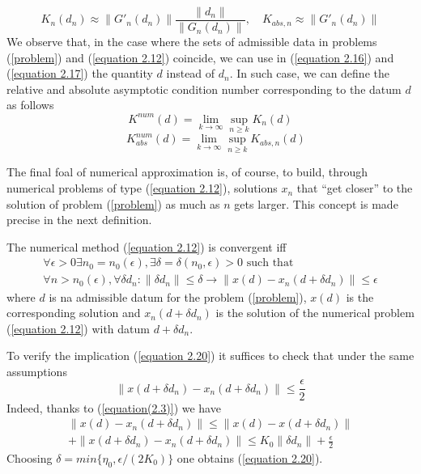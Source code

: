 \begin{equation}
    K_n(d_n) \approx \| G'_n (d_n) \| \frac{ \|d_n \|}{\|G_n(d_n) \|}, \quad K_{abs,n} \approx \|G'_n(d_n) \|
    \label{equation 2.19}
\end{equation}
We observe that, in the case where the sets of admissible data in problems (\ref{problem}) and (\ref{equation 2.12}) coincide, we can use in (\ref{equation 2.16}) and (\ref{equation 2.17}) the quantity $d$ instead of $d_n$. In such case, we can define the relative and absolute asymptotic condition number corresponding to the datum $d$ as follows
\[K^{num}(d) = \lim_{k \rightarrow \infty} \sup_{n \geq k} K_n(d)\] 
\[\quad K_{abs}^{num}(d) = \lim_{k \rightarrow \infty} \sup_{n \geq k} K_{abs, n}(d) \]

The final foal of numerical approximation is, of course, to build, through numerical problems of type (\ref{equation 2.12}), solutions $x_n$ that ``get closer'' to the solution of problem (\ref{problem}) as much as $n$ gets larger. This concept is made precise in the next definition.

\begin{definition}
    The numerical method (\ref{equation 2.12}) is convergent iff 
    \begin{multline}
        \forall \epsilon > 0 \exists n_0 = n_0 (\epsilon), \exists \delta = \delta (n_0, \epsilon) > 0 \text{ such that} \\
        \forall n > n_0(\epsilon), \forall \delta d_n : \|\delta d_n\| \leq \delta  \rightarrow \| x(d) - x_n(d + \delta d_n) \| \leq \epsilon
        \label{equation 2.20}
    \end{multline}
    where $d$ is na admissible datum for the problem (\ref{problem}), $x(d)$ is the corresponding solution and $x_n(d + \delta d_n)$ is the solution of the numerical problem (\ref{equation 2.12}) with datum $d + \delta d_n$.
\end{definition}

To verify the implication (\ref{equation 2.20}) it suffices to check that under the same assumptions 
\begin{equation}
    \| x(d + \delta d_n) - x_n(d + \delta d_n) \| \leq \frac{\epsilon}{2}
    \label{equation 2.21}
\end{equation}
Indeed, thanks to (\ref{equation(2.3)}) we have 
\begin{multline*}
    \| x(d) - x_n (d + \delta d_n) \| \leq \| x(d) - x(d + \delta d_n) \| \\
    + \| x(d + \delta d_n) - x_n (d + \delta d_n) \| \leq K_0 \| \delta d_n \| + \frac{\epsilon}{2}
\end{multline*}
Choosing $\delta = min\{ \eta_0, \epsilon / (2 K_0)\}$ one obtains (\ref{equation 2.20}).

